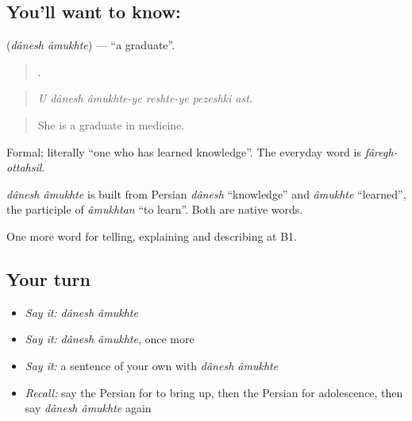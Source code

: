 \subsection*{You'll want to know:  }
\textbf{ } (\emph{dânesh âmukhte}) — \textquotedblleft{}a graduate\textquotedblright{}.

\begin{quote}
     .
\end{quote}

\begin{quote}
\emph{U dânesh âmukhte-ye reshte-ye pezeshki ast.}
\end{quote}

\begin{quote}
She is a graduate in medicine.
\end{quote}

Formal; literally \textquotedblleft{}one who has learned knowledge\textquotedblright{}. The everyday word is \emph{fâregh-ottahsil}.

\begin{cousinweb}
\emph{dânesh âmukhte} is built from Persian \emph{dânesh} \textquotedblleft{}knowledge\textquotedblright{} and \emph{âmukhte} \textquotedblleft{}learned\textquotedblright{}, the participle of \emph{âmukhtan} \textquotedblleft{}to learn\textquotedblright{}. Both are native words.
\end{cousinweb}

\begin{grammarlens}[title={What you've built}]
One more word for telling, explaining and describing at B1.
\end{grammarlens}

\subsection*{Your turn}
\begin{itemize}
\raggedright
  \item \emph{Say it:} \emph{dânesh âmukhte}
  \item \emph{Say it:} \emph{dânesh âmukhte}, once more
  \item \emph{Say it:} a sentence of your own with \emph{dânesh âmukhte}
  \item \emph{Recall:} say the Persian for to bring up, then the Persian for adolescence, then say \emph{dânesh âmukhte} again
\end{itemize}


